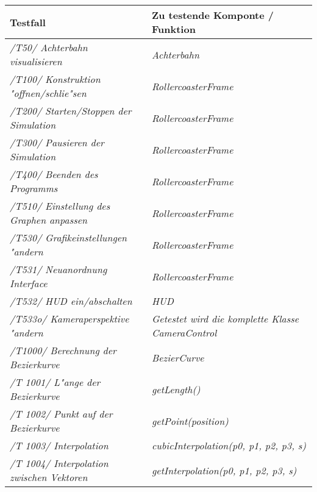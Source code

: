 \begin{longtable}{|p{.3\linewidth}|p{}}
Testfall & Zu testende Komponte / Funktion \\\hline

\textit{/T50/ Achterbahn visualisieren} & \textit{Achterbahn} \\\hline

\textit{/T100/ Konstruktion "offnen/schlie"sen} & \textit{RollercoasterFrame} \\\hline

\textit{/T200/ Starten/Stoppen der Simulation} & \textit{RollercoasterFrame} \\\hline

\textit{/T300/ Pausieren der Simulation} &  \textit{RollercoasterFrame}\\\hline

\textit{/T400/ Beenden des Programms} & \textit{RollercoasterFrame}\\\hline

\textit{/T510/ Einstellung des Graphen anpassen} &  \textit{RollercoasterFrame}\\\hline

\textit{ /T530/ Grafikeinstellungen "andern} &  \textit{RollercoasterFrame}\\\hline

\textit{/T531/ Neuanordnung Interface} &  \textit{RollercoasterFrame} \\\hline

\textit{/T532/ HUD ein/abschalten} & \textit{HUD}\\\hline

\textit{/T533o/ Kameraperspektive "andern} &  \textit{Getestet wird die komplette Klasse CameraControl}\\\hline

\textit{/T1000/ Berechnung der Bezierkurve}  &  \textit{BezierCurve}\\\hline

\textit{ /T 1001/ L"ange der Bezierkurve} &  \textit{getLength()}\\\hline

\textit{ /T 1002/ Punkt auf der Bezierkurve} &  \textit{getPoint(position)}\\\hline

\textit{ /T 1003/ Interpolation} &  \textit{cubicInterpolation(p0, p1, p2, p3, s)} \\\hline

\textit{ /T 1004/ Interpolation zwischen Vektoren} &  \textit{getInterpolation(p0, p1, p2, p3, s)}\\\hline


\end{longtable}
